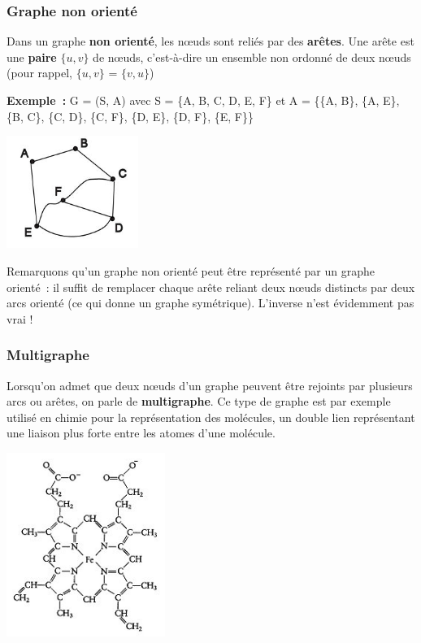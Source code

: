 		\subsubsection{Graphe non orienté}
			
			Dans un graphe \textbf{non orienté}, les n{\oe}uds sont 
			reliés par des \textbf{arêtes}. Une arête est une \textbf{paire}
			$\{u, v\}$ de n{\oe}uds, c'est-à-dire un ensemble non ordonné 
			de deux n{\oe}uds (pour rappel,
			$\{u, v\}$ = $\{v, u\}$)

			\textbf{Exemple~:} G = (S, A) avec S = \{A, B, C, D, E, F\} et 
			A = \{\{A, B\}, \{A, E\}, \{B, C\}, \{C, D\}, \{C, F\}, \{D, E\},
			\{D, F\}, \{E, F\}\}

			\begin{center}
			\includegraphics[width=4.284cm,height=3.657cm]{image/a2012Logique2eme-img043.jpg}
			\end{center}

			Remarquons qu'un graphe non orienté peut être représenté par un 
			graphe orienté~: il suffit de remplacer chaque arête
			reliant deux n{\oe}uds distincts par deux arcs orienté (ce qui donne 
			un graphe symétrique). L'inverse n'est évidemment pas vrai !

		\subsubsection{Multigraphe}
			
			Lorsqu'on admet que deux n{\oe}uds d'un graphe peuvent 
			être rejoints par plusieurs arcs ou arêtes, on parle de
			\textbf{multigraphe}. Ce type de graphe est par exemple 
			utilisé en chimie pour la représentation des molécules, un
			double lien représentant une liaison plus forte entre 
			les atomes d'une molécule.

			\begin{center}
			\includegraphics[width=5.172cm,height=5.974cm]{image/a2012Logique2eme-img044.jpg}
			\end{center}


